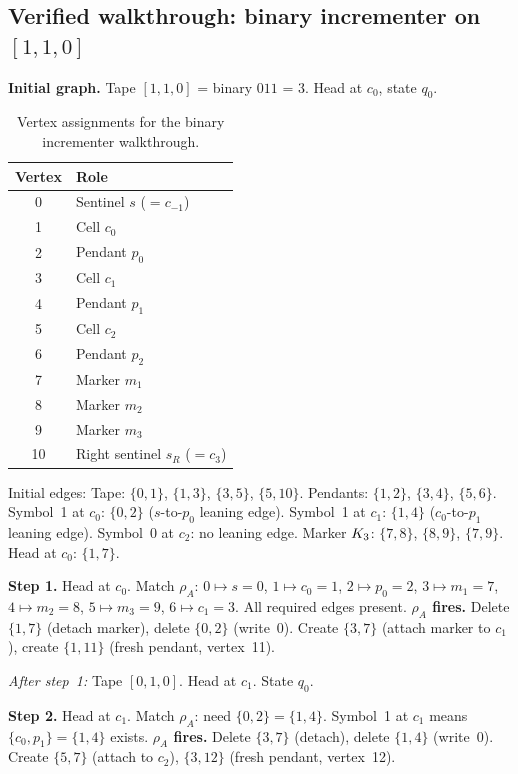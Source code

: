\documentclass{../shared/primo}
\begin{document}
\subsection{Verified walkthrough: binary incrementer on $[1,1,0]$}
\label{sec:walkthrough}

\textbf{Initial graph.} Tape $[1,1,0]$ = binary $011$ = $3$. Head at $c_0$, state $q_0$.

\begin{table}[ht]
\centering
\begin{tabular}{cl}
\toprule
Vertex & Role \\
\midrule
0 & Sentinel $s$ ($= c_{-1}$) \\
1 & Cell $c_0$ \\
2 & Pendant $p_0$ \\
3 & Cell $c_1$ \\
4 & Pendant $p_1$ \\
5 & Cell $c_2$ \\
6 & Pendant $p_2$ \\
7 & Marker $m_1$ \\
8 & Marker $m_2$ \\
9 & Marker $m_3$ \\
10 & Right sentinel $s_R$ ($= c_3$) \\
\bottomrule
\end{tabular}
\caption{Vertex assignments for the binary incrementer walkthrough.}
\label{tab:walkthrough-vertices}
\end{table}

Initial edges: Tape: $\{0,1\}$, $\{1,3\}$, $\{3,5\}$, $\{5,10\}$. Pendants: $\{1,2\}$, $\{3,4\}$, $\{5,6\}$. Symbol~1 at $c_0$: $\{0,2\}$ ($s$-to-$p_0$ leaning edge). Symbol~1 at $c_1$: $\{1,4\}$ ($c_0$-to-$p_1$ leaning edge). Symbol~0 at $c_2$: no leaning edge. Marker $K_{3}$: $\{7,8\}$, $\{8,9\}$, $\{7,9\}$. Head at $c_0$: $\{1,7\}$.

\textbf{Step 1.} Head at $c_0$. Match $\rho_A$: $0 \mapsto s = 0$, $1 \mapsto c_0 = 1$, $2 \mapsto p_0 = 2$, $3 \mapsto m_1 = 7$, $4 \mapsto m_2 = 8$, $5 \mapsto m_3 = 9$, $6 \mapsto c_1 = 3$. All required edges present. \textbf{$\rho_A$ fires.} Delete $\{1,7\}$ (detach marker), delete $\{0,2\}$ (write~0). Create $\{3,7\}$ (attach marker to $c_1$), create $\{1,11\}$ (fresh pendant, vertex~11).

\emph{After step~1:} Tape $[0,1,0]$. Head at $c_1$. State $q_0$.

\textbf{Step 2.} Head at $c_1$. Match $\rho_A$: need $\{0,2\} = \{1, 4\}$. Symbol~1 at $c_1$ means $\{c_0, p_1\} = \{1, 4\}$ exists. \textbf{$\rho_A$ fires.} Delete $\{3,7\}$ (detach), delete $\{1,4\}$ (write~0). Create $\{5,7\}$ (attach to $c_2$), $\{3,12\}$ (fresh pendant, vertex~12).
\end{document}

